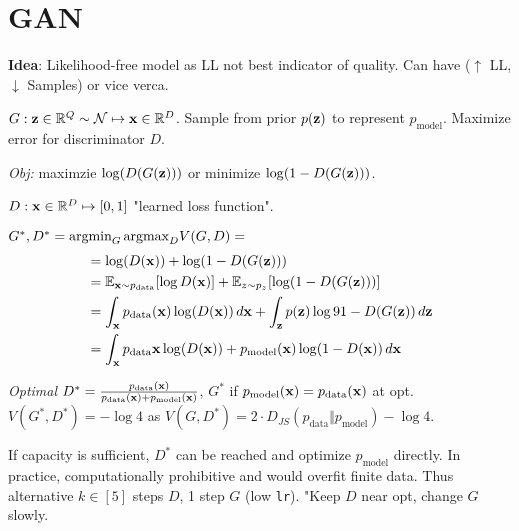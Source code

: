\section{GAN}
\textbf{Idea}: Likelihood-free model as LL not best indicator of quality. Can have (\(\uparrow\) LL, \(\downarrow\) Samples) or vice verca.

\begin{definition}[Generator]
    \(G: \vb{z} \in \mathbb{R}^Q \sim \operatorname{\mathcal{N}} \mapsto \vb{x} \in \mathbb{R}^D\). Sample from prior \(p(\vb{z})\) to represent \(p_{\text{model}}\). Maximize error for discriminator \(D\).

    \textit{Obj:} maximzie \(\log(D(G(\vb{z})))\) or minimize \(\log(1 - D(G(\vb{z})))\).
\end{definition}

\begin{definition}[Discriminator]
    \(D: \vb{x} \in \mathbb{R}^D \mapsto [0, 1]\) "learned loss function".
\end{definition}

\begin{definition}
    \(G^*, D^* = \text{argmin}_{G} \, \text{argmax}_{D} V(G, D) = \)
    \begin{align*}
    &= \log(D(\vb{x})) + \log(1 - D(G(\vb{z}))) \\
    &= \mathbb{E}_{\vb{x} \sim p_{\text{data}}}[\log D(\vb{x})] + \mathbb{E}_{z \sim p_z}[\log(1 - D(G(\vb{z})))] \\
    &= \int_{\vb{x}} p_{\text{data}}(\vb{x})\log(D(\vb{x})) \, d\vb{x} + \int_{\vb{z}} p(\vb{z}) \log91 - D(G(\vb{z})) \, d\vb{z} \\
    &= \int_{\vb{x}} p_{\text{data}}\vb{x} \log(D(\vb{x})) + p_{\text{model}}(\vb{x}) \log(1 - D(\vb{x})) \, d\vb{x}
    \end{align*}
\end{definition}

\textit{Optimal} \(D^* = \frac{p_{\text{data}}(\vb{x})}{p_{\text{data}}(\vb{x}) + p_{\text{model}}(\vb{x})}\), \(G^*\) if \(p_{\text{model}}(\vb{x}) = p_{\text{data}}(\vb{x})\) at opt. \(V(G^*, D^*) = -\log 4\) as \(V(G, D^*) = 2 \cdot D_{JS}(p_{\text{data}} \Vert p_{\text{model}}) - \log 4\).

\begin{definition}[Convergence]
    If capacity is sufficient, \(D^*\) can be reached and optimize \(p_{\text{model}}\) directly. In practice, computationally prohibitive and would overfit finite data. Thus alternative \(k \in [5]\) steps \(D\), 1 step \(G\) (low \texttt{lr}). "Keep \(D\) near opt, change \(G\) slowly.
\end{definition}

